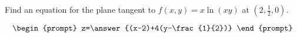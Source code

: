 \documentclass{ximera}
\author{David Guichard \and Neal Koblitz \and H. Jerome Keisler \and Albert Scheller \and Barry Balof \and Mike Wills \and Matthew Carr}
\begin{document}
\begin{exercise}




Find an equation for the plane tangent to $f(x,y)=x\ln(xy)$ at $(2,\frac{1}{2},0)$.

\[
\begin{prompt}
z=\answer{(x-2)+4(y-\frac{1}{2})}
\end{prompt}
\]

\end{exercise}
\end{document}
